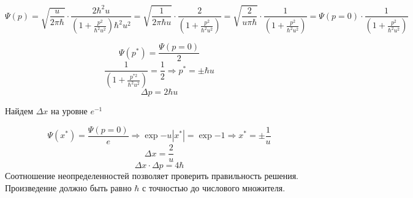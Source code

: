  $$\Psi(p)=\sqrt{\frac{u}{2\pi \hbar}} \cdot \frac{2\hbar ^2u}{(1+\frac{p^2}{\hbar ^2u^2})\hbar ^2u^2}=\sqrt{\frac{1}{2\pi \hbar u}} \cdot \frac{2}{(1+\frac{p^2}{\hbar ^2u^2})}=\sqrt{\frac{2}{u\pi \hbar}} \cdot \frac{1}{(1+\frac{p^2}{\hbar ^2u^2})}=\Psi(p=0)\cdot \frac{1}{(1+\frac{p^2}{\hbar ^2u^2})}$$

 $$\Psi(p^*)=\frac{\Psi(p=0)}{2}$$
 $$\frac{1}{(1+\frac{p^{*2}}{\hbar ^2u^2})}=\frac12 \Longrightarrow p^*=\pm \hbar u $$ 
 $$\Delta p=2\hbar u$$

Найдем $\Delta x$ на уровне $e^{-1}$

$$\Psi(x^*)=\frac{\Psi(p=0)}{e} \Longrightarrow \exp{-u|x^*|}=\exp{-1} \Longrightarrow x^*=\pm \frac{1}{u}$$
 $$\Delta x=\frac{2}{u}$$
 $$\Delta x \cdot \Delta p= 4\hbar$$
 Соотношение неопределенностей позволяет проверить правильность решения. Произведение должно быть равно $\hbar$ с точностью до числового множителя.